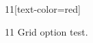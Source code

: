 \documentclass[paper=A4]{ropas-poster}
\begin{document}
\begin{postergrid}{1}{1}[text-color=red]
\begin{posterblock}{1}{1}
Grid option test.
\end{posterblock}
\end{postergrid}
\end{document}
